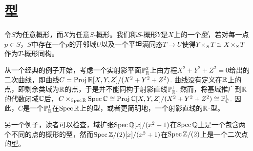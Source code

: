 \section{型}\label{s:4.4}


令$S$为任意概形，而$X$为任意$S$-概形。我们称$S$-概形$Y$是$X$上的一个\textit{型}，若对每一点$p\in S$，$S$中存在一个$p$的开邻域$U$以及一个平坦满同态$T\to U$使得$Y\times_S T\cong X\times_S T$作为$T$-概形同构。

从一个经典的例子开始，考虑一个实射影平面$\mathbb{P}_{\mathbb{R}}^2$上由方程$X^2+Y^2+Z^2=0$给出的二次曲线，即曲线$C=\operatorname{Proj} \mathbb{R}[X,Y,Z]/(X^2+Y^2+Z^2)$. 曲线没有定义在$\mathbb{R}$上的点，即剩余类域为$\mathbb{R}$的点，于是并不能同构于射影直线$\mathbb{P}_{\mathbb{R}}^1$. 然而，将基域推广到$\mathbb{R}$的代数闭域$\mathbb{C}$后，$C\times_{\operatorname{Spec} \mathbb{R}}\operatorname{Spec} \mathbb{C}\cong \operatorname{Proj} \mathbb{C}[X,Y,Z]/(X^2+Y^2+Z^2)\cong \mathbb{P}_{\mathbb{C}}^1$. 因此，$C$是一个$\mathbb{P}_{\mathbb{R}}^1$在$\operatorname{Spec} \mathbb{R}$上的型，或者更简明地，一个射影直线的$\mathbb{R}$-型。

另一个例子，读者可以检查，域扩张$\operatorname{Spec} \mathbb Q[x]/(x^2+1)$在$\operatorname{Spec} \mathbb Q$上是一个包含两个不同的点的概形的型，然而$\operatorname{Spec} \mathbb{Z}/(2)[x]/(x^2+1)$在$\operatorname{Spec} \mathbb{Z}/(2)$上是一个二次点的型。

\nottran

